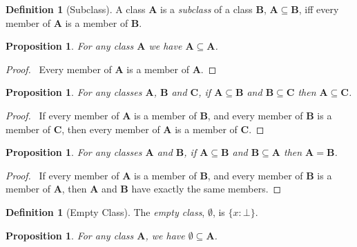 \documentclass{article}
\let\qed\relax
\newtheorem{proposition}[axiom]{Proposition}
\theoremstyle{definition}
\newtheorem{definition}[axiom]{Definition}
\begin{document}
    \begin{definition}[Subclass]
        A class $\mathbf{A}$ is a \emph{subclass} of a class $\mathbf{B}$,
        $\mathbf{A} \subseteq \mathbf{B}$, iff every member of $\mathbf{A}$
        is a member of $\mathbf{B}$.
    \end{definition}

    \begin{proposition}
        For any class $\mathbf{A}$ we have $\mathbf{A} \subseteq \mathbf{A}$.
    \end{proposition}

    \begin{proof}
        \pf\ Every member of $\mathbf{A}$ is a member of $\mathbf{A}$. \qed
    \end{proof}

    \begin{proposition}
        For any classes $\mathbf{A}$, $\mathbf{B}$ and $\mathbf{C}$, if $\mathbf{A} \subseteq \mathbf{B}$
        and $\mathbf{B} \subseteq \mathbf{C}$ then $\mathbf{A} \subseteq \mathbf{C}$.
    \end{proposition}

    \begin{proof}
        \pf\ If every member of $\mathbf{A}$ is a member of $\mathbf{B}$,
        and every member of $\mathbf{B}$ is a member of $\mathbf{C}$,
        then every member of $\mathbf{A}$ is a member of $\mathbf{C}$. \qed
    \end{proof}

    \begin{proposition}
        For any classes $\mathbf{A}$ and $\mathbf{B}$, if $\mathbf{A} \subseteq \mathbf{B}$
        and $\mathbf{B} \subseteq \mathbf{A}$ then $\mathbf{A} = \mathbf{B}$.
    \end{proposition}

    \begin{proof}
        \pf\ If every member of $\mathbf{A}$ is a member of $\mathbf{B}$,
        and every member of $\mathbf{B}$ is a member of $\mathbf{A}$,
        then $\mathbf{A}$ and $\mathbf{B}$ have exactly the same members. \qed
    \end{proof}

    \begin{definition}[Empty Class]
        The \emph{empty class}, $\emptyset$, is $\{ x : \bot \}$.
    \end{definition}

    \begin{proposition}
        For any class $\mathbf{A}$, we have $\emptyset \subseteq \mathbf{A}$.
    \end{proposition}
\end{document}
